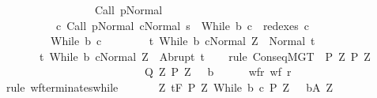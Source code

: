 \begin{isabellebody}
\ \ \ \ \ \ \ \ \ \ \ \ \ \ \ \ \ {\isasymGamma}{\isasymturnstile}Call\ p{\isasymdown}Normal\ {\isasymsigma}\ {\isasymand}\isanewline
\ \ \ \ \ \ \ \ \ \ {\isacharparenleft}{\isasymexists}c{\isacharprime}{\isachardot}\ {\isasymGamma}{\isasymturnstile}{\isacharparenleft}Call\ p{\isacharcomma}Normal\ {\isasymsigma}{\isacharparenright}{\isasymrightarrow}\isactrlsup {\isacharplus}{\isacharparenleft}c{\isacharprime}{\isacharcomma}Normal\ s{\isacharparenright}\ {\isasymand}\ While\ b\ c\ {\isasymin}\ redexes\ c{\isacharprime}{\isacharparenright}{\isacharbraceright}\isanewline
\ \ \ \ \ \ \ \ \ {\isacharparenleft}While\ b\ c{\isacharparenright}\ \isanewline
\ \ \ \ \ \ \ {\isacharbraceleft}t{\isachardot}\ {\isasymGamma}{\isasymturnstile}{\isasymlangle}While\ b\ c{\isacharcomma}Normal\ Z{\isasymrangle}\ {\isasymRightarrow}\ Normal\ t{\isacharbraceright}{\isacharcomma}\isanewline
\ \ \ \ \ \ \ {\isacharbraceleft}t{\isachardot}\ {\isasymGamma}{\isasymturnstile}{\isasymlangle}While\ b\ c{\isacharcomma}Normal\ Z{\isasymrangle}\ {\isasymRightarrow}\ Abrupt\ t{\isacharbraceright}{\isachardoublequoteclose}\isanewline
\ \ \isamarkupfalse%
\ {\isacharparenleft}rule\ ConseqMGT\ {\isacharbrackleft}\ {\isacharquery}P{\isacharprime}{\isacharequal}{\isachardoublequoteopen}{\isasymlambda}\ Z{\isachardot}\ {\isacharquery}P{\isacharprime}\ Z{\isachardoublequoteclose}\ \isanewline
\ \ \ \ \ \ \ \ \ \ \ \ \ \ \ \ \ \ \ \ \ \ \ \ \ \ {\isacharquery}Q{\isacharprime}{\isacharequal}{\isachardoublequoteopen}{\isasymlambda}\ Z{\isachardot}\ {\isacharquery}P{\isacharprime}\ Z\ {\isasyminter}\ {\isacharminus}\ b{\isachardoublequoteclose}{\isacharbrackright}{\isacharparenright}\isanewline
\ \ \ \ \isamarkupfalse%
\ wf{\isacharunderscore}r{\isacharcolon}\ {\isachardoublequoteopen}wf\ {\isacharquery}r{\isachardoublequoteclose}\ \isamarkupfalse%
\ {\isacharparenleft}rule\ wf{\isacharunderscore}terminates{\isacharunderscore}while{\isacharparenright}\isanewline
\ \ \ \ \isamarkupfalse%
\ {\isachardoublequoteopen}{\isasymforall}\ Z{\isachardot}\ {\isasymGamma}{\isacharcomma}{\isasymTheta}{\isasymturnstile}\isactrlsub t\isactrlbsub {\isacharslash}F\isactrlesub \ {\isacharparenleft}{\isacharquery}P{\isacharprime}\ Z{\isacharparenright}\ {\isacharparenleft}While\ b\ c{\isacharparenright}\ {\isacharparenleft}{\isacharquery}P{\isacharprime}\ Z\ {\isasyminter}\ {\isacharminus}\ b{\isacharparenright}{\isacharcomma}{\isacharparenleft}{\isacharquery}A\ Z{\isacharparenright}{\isachardoublequoteclose}\isanewline

\end{isabellebody}
